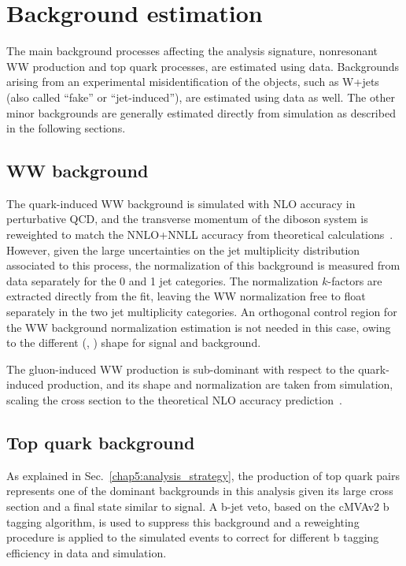 \section{Background estimation}\label{chap5:backgrounds}

The main background processes affecting the analysis signature, nonresonant WW production and top quark processes, are estimated using data. Backgrounds arising from an experimental misidentification of the objects, such as W+jets (also called ``fake'' or ``jet-induced''), are estimated using data as well. The other minor backgrounds are generally estimated directly from simulation as described in the following sections.

\subsection{WW background}

The quark-induced WW background is simulated with NLO accuracy in perturbative QCD, and the transverse momentum of the diboson system is reweighted to match the NNLO+NNLL accuracy from theoretical calculations~\cite{Meade:2014fca,Jaiswal:2014yba}. However, given the large uncertainties on the jet multiplicity distribution associated to this process, the normalization of this background is measured from data separately for the 0 and 1 jet categories. The normalization $k$-factors are extracted directly from the fit, leaving the WW normalization free to float separately in the two jet multiplicity categories. An orthogonal control region for the WW background normalization estimation is not needed in this case, owing to the different (\mll, \mt) shape for signal and background.

The gluon-induced WW production is sub-dominant with respect to the quark-induced production, and its shape and normalization are taken from simulation, scaling the cross section to the theoretical NLO accuracy prediction~\cite{Caola:2015rqy}.

\subsection{Top quark background}

As explained in Sec.~\ref{chap5:analysis_strategy}, the production of top quark pairs represents one of the dominant backgrounds in this analysis given its large cross section and a final state similar to signal. A b-jet veto, based on the cMVAv2 b tagging algorithm, is used to suppress this background and a reweighting procedure is applied to the simulated events to correct for different b tagging efficiency in data and simulation.

